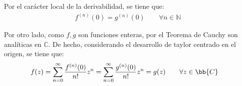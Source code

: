 \documentclass[12pt]{article}
\begin{document}
\begin{ejercicio}[3 puntos]
\begin{enumerate}
            Por el carácter local de la derivabilidad, se tiene que:
            \begin{align*}
                f^{(n)}(0) = g^{(n)}(0) \qquad \forall n\in \mathbb{N}
            \end{align*}

            Por otro lado, como $f,g$ son funciones enteras, por el Teorema de Cauchy son analíticas en $\mathbb{C}$. De hecho, considerando el desarrollo de taylor centrado en el origen, se tiene que:
            \begin{align*}
                f(z) &= \sum_{n=0}^{\infty} \frac{f^{(n)}(0)}{n!} z^n = \sum_{n=0}^{\infty} \frac{g^{(n)}(0)}{n!} z^n = g(z)\qquad \forall z\in \bb{C}
            \end{align*}
        \end{enumerate}
    \end{ejercicio}
\end{document}
